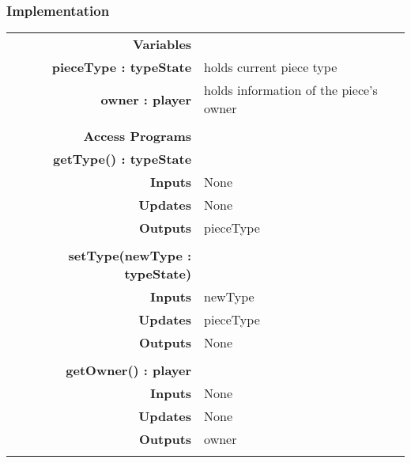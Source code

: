 \documentclass[10pt]{article}
\begin{document}
    \subsubsection{Implementation}
        \begin{tabularx}{\linewidth}{ >{\bfseries}r Xp{5cm} }
            Variables       & \begin{tabular}[t]{@{} l p{8cm}} 
                                     & \\
                                    pieceType : typeState & holds current piece type \\
                                    owner : player & holds information of the piece's owner \\
                              \end{tabular} \\

            Access Programs & \begin{tabular}[t]{@{} l l p{8cm}} 
                                     & \\
                                    \bf{getType()} : typeState & \\
                                    Inputs &  None \\
                                    Updates & None \\
                                    Outputs & pieceType \\
                                     & \\
                                    \bf{setType(newType : typeState)} & \\
                                    Inputs & newType \\
                                    Updates & pieceType \\ 
                                    Outputs & None \\
                                     & \\
                                    \bf{getOwner()} : player & \\
                                    Inputs & None \\
                                    Updates & None \\
                                    Outputs & owner \\ 
                              \end{tabular} \\
                              
        \end{tabularx}
        
\end{document}
